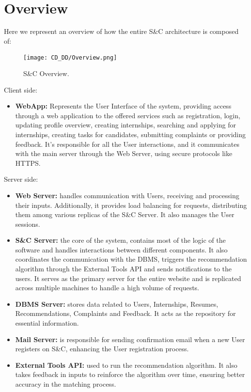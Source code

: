 \section{Overview}
\label{sec:overview}%
Here we represent an overview of how the entire S\&C architecture is composed of:

\begin{figure}[H]
    \begin{center}
        \texttt{[image: CD\_DD/Overview.png]}
        \caption{S\&C Overview.}
        \label{fig:CKB_overview}%
    \end{center}
\end{figure}

\noindent Client side:
\begin{itemize}
    \item \textbf{WebApp:} Represents the User Interface of the system, providing access through a web application to the offered services such as registration, login, updating profile overview, creating internships, searching and applying for internships, creating tasks for candidates, submitting complaints or providing feedback. It’s responsible for all the User interactions, and it communicates with the main server through the Web Server, using secure protocols like HTTPS.
\end{itemize}
\noindent Server side:
\begin{itemize}
    \item \textbf{Web Server:} handles communication with Users, receiving and processing their inputs. Additionally, it provides load balancing for requests, distributing them among various replicas of the S\&C Server. It also manages the User sessions.
    \item \textbf{S\&C Server:} the core of the system, contains most of the logic of the software and handles interactions between different components. It also coordinates the communication with the DBMS, triggers the recommendation algorithm through the External Tools API and sends notifications to the users. It serves as the primary server for the entire website and is replicated across multiple machines to handle a high volume of requests.
    \item \textbf{DBMS Server:} stores data related to Users, Internships, Resumes, Recommendations, Complaints and Feedback. It acts as the repository for essential information.
    \item \textbf{Mail Server:} is responsible for sending confirmation email when a new User registers on S\&C, enhancing the User registration process.
    \item \textbf{External Tools API:} used to run the recommendation algorithm. It also takes feedback in inputs to reinforce the algorithm over time, ensuring better accuracy in the matching process.
\end{itemize}

